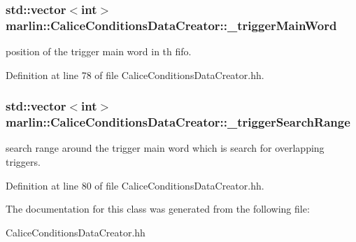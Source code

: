 \subsubsection[{\_\-triggerMainWord}]{\setlength{\rightskip}{0pt plus 5cm}std::vector$<$int$>$ {\bf marlin::CaliceConditionsDataCreator::\_\-triggerMainWord}\hspace{0.3cm}{\ttfamily  [protected]}}\label{classmarlin_1_1CaliceConditionsDataCreator_a0459f44af2be6a6c11e129ec7a0f053c}


position of the trigger main word in th fifo. 

Definition at line 78 of file CaliceConditionsDataCreator.hh.
\subsubsection[{\_\-triggerSearchRange}]{\setlength{\rightskip}{0pt plus 5cm}std::vector$<$int$>$ {\bf marlin::CaliceConditionsDataCreator::\_\-triggerSearchRange}\hspace{0.3cm}{\ttfamily  [protected]}}\label{classmarlin_1_1CaliceConditionsDataCreator_a0e3e6e12b1a9177d4c233719db4978ca}


search range around the trigger main word which is search for overlapping triggers. 

Definition at line 80 of file CaliceConditionsDataCreator.hh.

The documentation for this class was generated from the following file:\begin{DoxyCompactItemize}
\item 
CaliceConditionsDataCreator.hh\end{DoxyCompactItemize}
